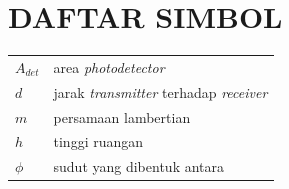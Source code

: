\chapter*{DAFTAR SIMBOL}

\begin{center}
	\centering
	\begin{tabular}{ll}
		$A_{det}$ & area \textit{photodetector}\\
		$d$ & jarak \textit{transmitter} terhadap \textit{receiver}\\
		$m$ & persamaan lambertian\\
		$h$ & tinggi ruangan\\
		$\phi$ & sudut yang dibentuk antara\\
		
		
		
	\end{tabular}
\end{center}